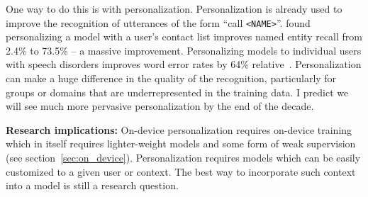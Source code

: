 One way to do this is with personalization. Personalization is already used to
improve the recognition of utterances of the form ``call \texttt{<NAME>}''.
\citet{sim2019personalization} found personalizing a model with a user's
contact list improves named entity recall from 2.4\% to 73.5\% -- a massive
improvement. Personalizing models to individual users with speech disorders
improves word error rates by 64\% relative~\citep{sim2019investigation}.
Personalization can make a huge difference in the quality of the
recognition, particularly for groups or domains that are underrepresented in
the training data. I predict we will see much more pervasive personalization by
the end of the decade.

{\bf Research implications:} On-device personalization requires on-device
training which in itself requires lighter-weight models and some form of weak
supervision (see section~\ref{sec:on_device}).  Personalization requires models
which can be easily customized to a given user or context. The best way to
incorporate such context into a model is still a research question.
